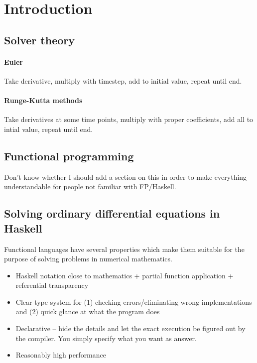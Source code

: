 \chapter{Introduction} 

\section{Solver theory}

\subsubsection{Euler}
Take derivative, multiply with timestep, add to initial value, repeat until end.

\subsubsection{Runge-Kutta methods}
Take derivatives at some time points, multiply with proper coefficients, add all to intial value, repeat until end.

\section{Functional programming}
Don't know whether I should add a section on this in order to make everything understandable for people not familiar with FP/Haskell.

\section{Solving ordinary differential equations in Haskell}
\lstset{style=haskellStyle}

Functional languages have several properties which make them suitable for the purpose of solving problems in numerical mathematics.
\begin{itemize}
	\item Haskell notation close to mathematics + partial function application + referential transparency
	\item Clear type system for (1) checking errors/eliminating wrong implementations and (2) quick glance at what the program does
	\item Declarative -- hide the details and let the exact execution be figured out by the compiler. You simply specify what you want as answer.
	\item Reasonably high performance \cite{Bench}
\end{itemize}

